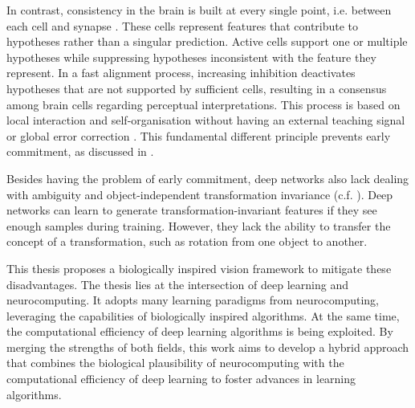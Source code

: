 In contrast, consistency in the brain is built at every single point, i.e. between each cell and synapse .
These cells represent features that contribute to hypotheses rather than a singular prediction.
Active cells support one or multiple hypotheses while suppressing hypotheses inconsistent with the feature they represent.
In a fast alignment process, increasing inhibition  deactivates hypotheses that are not supported by sufficient cells, resulting in a consensus among brain cells regarding perceptual interpretations.
This process is based on local interaction and self-organisation  without having an external teaching signal or global error correction . This fundamental different principle prevents early commitment, as discussed in .

Besides having the problem of early commitment, deep networks also lack dealing with ambiguity and object-independent transformation invariance (c.f. ).
Deep networks can learn to generate transformation-invariant features if they see enough samples during training.
However, they lack the ability to transfer the concept of a transformation, such as rotation from one object to another.

This thesis proposes a biologically inspired vision framework to mitigate these disadvantages. 
The thesis lies at the intersection of deep learning and neurocomputing. It adopts many learning paradigms from neurocomputing, leveraging the capabilities of biologically inspired algorithms. At the same time, the computational efficiency of deep learning algorithms is being exploited. By merging the strengths of both fields, this work aims to develop a hybrid approach that combines the biological plausibility of neurocomputing with the computational efficiency of deep learning to foster advances in learning algorithms.


